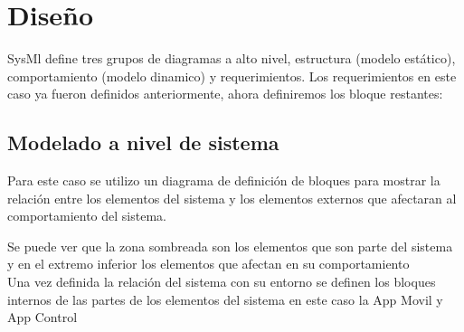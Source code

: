 \documentclass[16pt, article,notitlepage]{article}
\begin{document}
\section{Diseño}
SysMl define tres grupos de diagramas a alto nivel, estructura (modelo estático), comportamiento (modelo dinamico) y requerimientos. Los requerimientos en este caso ya fueron definidos anteriormente, ahora definiremos los bloque restantes: 
\subsection{Modelado a nivel de sistema}
Para este caso se utilizo un diagrama de definición de bloques para mostrar la relación entre los elementos del sistema y los elementos externos que afectaran al comportamiento del sistema.
\begin{figure}[H]
\end{figure}
Se puede ver que la zona sombreada son los elementos que son parte del sistema y en el extremo inferior los elementos que afectan en su comportamiento
\\
Una vez definida la relación del sistema con su entorno se definen los bloques internos de las partes de los elementos del sistema en este caso la App Movil y App Control
\\
\end{document}
